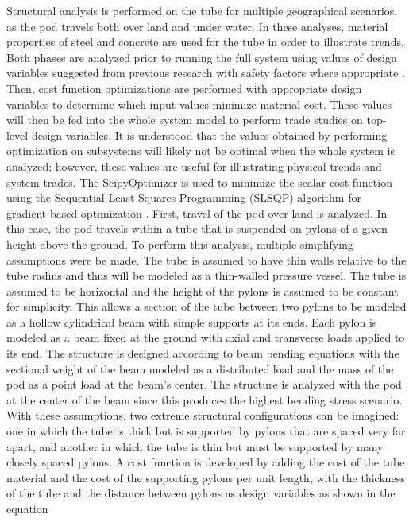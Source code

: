 Structural analysis is performed on the tube for multiple geographical scenarios,
as the pod travels both over land and under water.
In these analyses, material properties of steel and concrete are used for the
tube in order to illustrate trends.
Both phases are analyzed prior to running the full system using values of
design variables suggested from previous research with safety factors where
appropriate \cite{Chin}. Then, cost function optimizations are performed with
appropriate design variables to determine which input values minimize material cost.
These values will then be fed into the whole system model to perform trade
studies on top-level design variables. It is understood that the values
obtained by performing optimization on subsystems will likely not be optimal
when the whole system is analyzed; however, these values are useful for
illustrating physical trends and system trades. The ScipyOptimizer is used to
minimize the scalar cost function using the Sequential Least Squares Programming
(SLSQP) algorithm for gradient-based optimization \cite{GrayBenchmarking2013,Scipy}.
First, travel of the pod over land is analyzed. In this case, the pod travels
within a tube that is suspended on pylons of a given height above the ground.
To perform this analysis, multiple simplifying assumptions were be made. The
tube is assumed to have thin walls relative to the tube radius and thus will be
modeled as a thin-walled pressure vessel. The tube is assumed to be horizontal
and the height of the pylons is assumed to be constant for simplicity. This allows a section
of the tube between two pylons to be modeled as a hollow cylindrical beam with
simple supports at its ends. Each pylon is modeled as a beam fixed at the
ground with axial and transverse loads applied to its end. The structure is
designed according to beam bending equations with the sectional weight of the
beam modeled as a distributed load and the mass of the pod as a point load at
the beam’s center. The structure is analyzed with the pod at the center of the
beam since this produces the highest bending stress scenario.  With these
assumptions, two extreme structural configurations can be imagined: one in
which the tube is thick but is supported by pylons that are spaced very far apart,
and another in which the tube is thin but must be supported by many closely spaced pylons.
A cost function is developed by adding the cost of the tube material and the
cost of the supporting pylons per unit length, with the thickness of the tube
and the distance between pylons as design variables as shown in the equation

